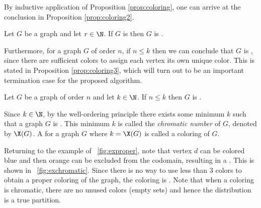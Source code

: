 By inductive application of Proposition \ref{prop:coloring}, one can arrive at the conclusion in Proposition
\ref{prop:coloring2}.

\begin{proposition}
  \label{prop:coloring2}
  Let \(G\) be a graph and let \(r\in\N\).  If \(G\) is  then \(G\) is .
\end{proposition}

Furthermore, for a graph \(G\) of order \(n\), if \(n\le k\) then we can conclude that \(G\) is ,
since there are sufficient colors to assign each vertex its own unique color.  This is stated in Proposition
\ref{prop:coloring3}, which will turn out to be an important termination case for the proposed algorithm.

\begin{proposition}
  \label{prop:coloring3}
  Let \(G\) be a graph of order \(n\) and let \(k\in\N\).  If \(n\le k\) then \(G\) is .
\end{proposition}

Since \(k\in\N\), by the well-ordering principle there exists some minimum \(k\) such that a graph \(G\) is
.  This minimum \(k\) is called the \emph{chromatic number} of \(G\), denoted by \(\X(G)\).  A
 for a graph \(G\) where \(k=\X(G)\) is called a \emph{} coloring of \(G\).

Returning to the example  of \figurename~\ref{fig:exproper}, note that vertex \(d\) can be colored blue
and then orange can be excluded from the codomain, resulting in a .  This is shown in
\figurename~\ref{fig:exchromatic}.  Since there is no way to use less than 3 colors to obtain a proper coloring of
the graph, the coloring is .  Note that when a coloring is chromatic, there are no unused colors
(empty sets) and hence the distribution is a true partition.

